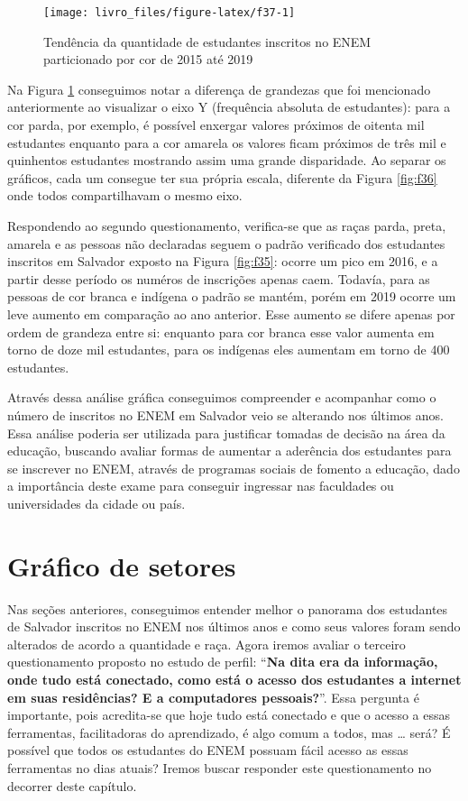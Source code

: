 \documentclass[
  oneside]{book}
\begin{document}
\begin{figure}

{\centering \texttt{[image: livro\_files/figure-latex/f37-1]} 

}

\caption{Tendência da quantidade de estudantes inscritos no ENEM particionado por cor de 2015 até 2019}\label{fig:f37}
\end{figure}

Na Figura \ref{fig:f37} conseguimos notar a diferença de grandezas que foi mencionado anteriormente ao visualizar o eixo Y (frequência absoluta de estudantes): para a cor parda, por exemplo, é possível enxergar valores próximos de oitenta mil estudantes enquanto para a cor amarela os valores ficam próximos de três mil e quinhentos estudantes mostrando assim uma grande disparidade. Ao separar os gráficos, cada um consegue ter sua própria escala, diferente da Figura \ref{fig:f36} onde todos compartilhavam o mesmo eixo.

Respondendo ao segundo questionamento, verifica-se que as raças parda, preta, amarela e as pessoas não declaradas seguem o padrão verificado dos estudantes inscritos em Salvador exposto na Figura \ref{fig:f35}: ocorre um pico em 2016, e a partir desse período os numéros de inscrições apenas caem. Todavía, para as pessoas de cor branca e indígena o padrão se mantém, porém em 2019 ocorre um leve aumento em comparação ao ano anterior. Esse aumento se difere apenas por ordem de grandeza entre si: enquanto para cor branca esse valor aumenta em torno de doze mil estudantes, para os indígenas eles aumentam em torno de 400 estudantes.

Através dessa análise gráfica conseguimos compreender e acompanhar como o número de inscritos no ENEM em Salvador veio se alterando nos últimos anos. Essa análise poderia ser utilizada para justificar tomadas de decisão na área da educação, buscando avaliar formas de aumentar a aderência dos estudantes para se inscrever no ENEM, através de programas sociais de fomento a educação, dado a importância deste exame para conseguir ingressar nas faculdades ou universidades da cidade ou país.

\hypertarget{gset}{%
\section{Gráfico de setores}\label{gset}}

Nas seções anteriores, conseguimos entender melhor o panorama dos estudantes de Salvador inscritos no ENEM nos últimos anos e como seus valores foram sendo alterados de acordo a quantidade e raça. Agora iremos avaliar o terceiro questionamento proposto no estudo de perfil: ``\textbf{Na dita era da informação, onde tudo está conectado, como está o acesso dos estudantes a internet em suas residências? E a computadores pessoais?}''. Essa pergunta é importante, pois acredita-se que hoje tudo está conectado e que o acesso a essas ferramentas, facilitadoras do aprendizado, é algo comum a todos, mas \ldots{} será? É possível que todos os estudantes do ENEM possuam fácil acesso as essas ferramentas no dias atuais? Iremos buscar responder este questionamento no decorrer deste capítulo.
\end{document}
